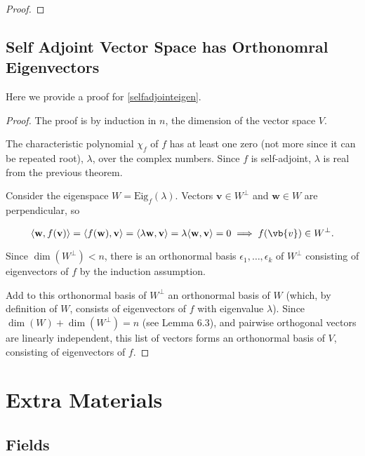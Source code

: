 \documentclass[a4paper,12pt]{report}
\begin{document}
\begin{appendices}
\begin{proof}
\end{proof}

\section{Self Adjoint Vector Space has Orthonomral Eigenvectors} \label{selfadjointeigenapp} 

Here we provide a proof for \cref{selfadjointeigen}.

\begin{proof}
The proof is by induction in $n$, the dimension of the vector space $V$. 

The characteristic polynomial $\chi_f$ of $f$ has at least one zero (not more since it can be repeated root), $\lambda$, over the complex numbers. Since $f$ is self-adjoint, $\lambda$ is real from the previous theorem. 
    
Consider the eigenspace $W = \text{Eig}_f(\lambda)$. Vectors $\mathbf{v} \in W^\perp$ and $\mathbf{w} \in W$ are perpendicular, so
    
\begin{equation}
    \langle \mathbf{w}, f(\mathbf{v}) \rangle = \langle f(\mathbf{w}), \mathbf{v} \rangle = \langle \lambda \mathbf{w}, \mathbf{v} \rangle = \lambda \langle \mathbf{w}, \mathbf{v} \rangle = 0 \implies f(\vb{v} ) \in W^{\perp }.
\end{equation}
    
Since $\dim(W^\perp) < n$, there is an orthonormal basis $\epsilon_1, \ldots, \epsilon_k$ of $W^\perp$ consisting of eigenvectors of \(f\) by the induction assumption. 
    
Add to this orthonormal basis of $W^\perp$ an orthonormal basis of $W$ (which, by definition of $W$, consists of eigenvectors of $f$ with eigenvalue $\lambda$). Since $\dim(W) + \dim(W^\perp) = n$ (see Lemma 6.3), and pairwise orthogonal vectors are linearly independent, this list of vectors forms an orthonormal basis of $V$, consisting of eigenvectors of $f$.


\end{proof}


\chapter{Extra Materials}

\section{Fields} \label{fields} 


\end{appendices}
\end{document}
